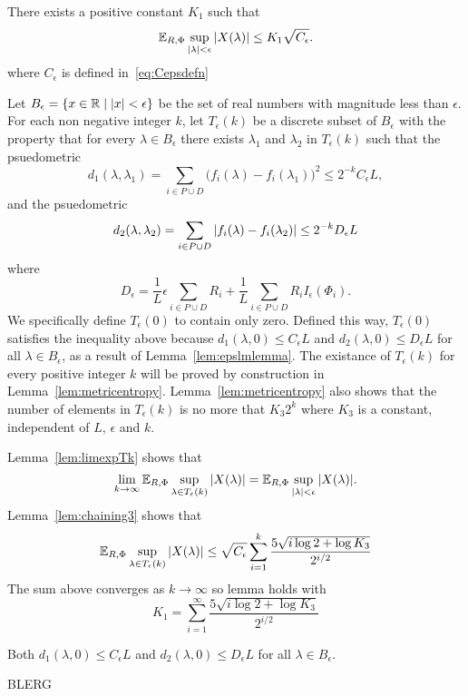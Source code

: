 \documentclass[journal]{IEEEtran}
\begin{document}
\begin{lemma}\label{lem:chaining2}
There exists a positive constant $K_1$ such that
\[
{\mathbb E}_{R,\Phi} \sup_{{\vert \lambda \vert} < \epsilon} {\left\vert  X(\lambda)  \right\vert} \leq K_1 \sqrt{C_\epsilon}.
\]
where $C_\epsilon$ is defined in~\eqref{eq:Cepsdefn}
\end{lemma}
\begin{IEEEproof}
Let $B_\epsilon = \{x \in {\mathbb R} \mid {\left\vert x \right\vert} < \epsilon\}$ be the set of real numbers with magnitude less than $\epsilon$.  For each non negative integer $k$, let $T_\epsilon(k)$ be a discrete subset of $B_\epsilon$ with the property that for every $\lambda \in B_\epsilon$ there exists $\lambda_1$ and $\lambda_2$ in $T_\epsilon(k)$ such that the psuedometric
\[
d_1(\lambda, \lambda_1) = \sum_{i \in P \cup D} \big( f_{i}(\lambda) - f_{i}(\lambda_1) \big)^2 \leq 2^{-k} C_\epsilon L,
\]
and the psuedometric
\[
d_2(\lambda, \lambda_2) = \sum_{i \in P \cup D} {\vert f_{i}(\lambda) - f_{i}(\lambda_2) \vert} \leq 2^{-k} D_\epsilon L
\]
where 
\begin{equation}\label{eq:Depsdefn}
D_\epsilon = \frac{1}{L}\epsilon\sum_{i\in P \cup D}R_i + \frac{1}{L}\sum_{i\in P \cup D}R_i I_{\epsilon}(\Phi_i).
\end{equation}
We specifically define $T_\epsilon(0)$ to contain only zero.  Defined this way, $T_\epsilon(0)$ satisfies the inequality above because $d_1(\lambda, 0) \leq C_\epsilon L $ and $d_2(\lambda, 0) \leq D_\epsilon L$ for all $\lambda \in B_\epsilon$, as a result of Lemma~\ref{lem:epslmlemma}.  The existance of $T_\epsilon(k)$ for every positive integer $k$ will be proved by construction in Lemma~\ref{lem:metricentropy}.  Lemma~\ref{lem:metricentropy} also shows that the number of elements in $T_\epsilon(k)$ is no more that $K_3 2^k$ where $K_3$ is a constant, independent of $L$, $\epsilon$ and $k$.

Lemma~\ref{lem:limexpTk} shows that
\[
\lim_{k\rightarrow\infty}{\mathbb E}_{R,\Phi}\sup_{\lambda \in T_\epsilon(k)} {\vert X(\lambda) \vert} = {\mathbb E}_{R,\Phi} \sup_{{\vert \lambda \vert} < \epsilon} {\vert X(\lambda) \vert}.
\]
Lemma~\ref{lem:chaining3} shows that
\[
{\mathbb E}_{R,\Phi} \sup_{\lambda \in T_\epsilon(k)} {\vert X(\lambda) \vert} \leq \sqrt{C_\epsilon} \sum_{i=1}^k \frac{5\sqrt{i \log 2 + \log K_3}}{2^{i/2}}
\]
The sum above converges as $k\rightarrow\infty$ so lemma holds with
\[
K_1 = \sum_{i=1}^\infty \frac{5\sqrt{i \log 2 + \log K_3}}{2^{i/2}}
\]
\end{IEEEproof}

\begin{lemma}
Both $d_1(\lambda, 0) \leq C_\epsilon L $ and $d_2(\lambda, 0) \leq D_\epsilon L$ for all $\lambda \in B_\epsilon$.
\end{lemma}
\begin{IEEEproof}
BLERG
\end{IEEEproof}
\end{document}
